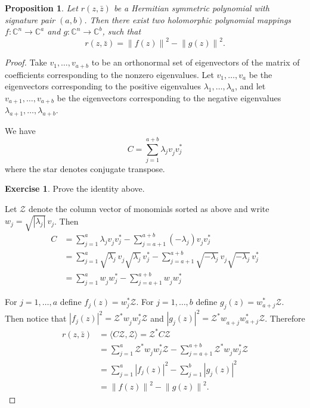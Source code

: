 \documentclass[12pt,openany]{book}
\newcommand{\abs}[1]{\left\lvert {#1} \right\rvert}
\newcommand{\norm}[1]{\left\lVert {#1} \right\rVert}
\newcommand{\C}{{\mathbb{C}}}
\newcommand{\sZ}{{\mathcal{Z}}}
\theoremstyle{plain}
\newtheorem{prop}[thm]{Proposition}
\theoremstyle{remark}
\theoremstyle{definition}
\theoremstyle{exercise}
\newtheorem{exercise}{Exercise}[section]
\theoremstyle{example}
\begin{document}
\begin{prop} \label{prop:sqnormsdecpoly}
Let $r(z,\bar{z})$ be a Hermitian symmetric polynomial with
signature pair $(a,b)$.
Then there exist
two holomorphic polynomial mappings
$f \colon \C^n \to \C^a$ and
$g \colon \C^n \to \C^b$, such that
\begin{equation}
r(z,\bar{z}) = \norm{f(z)}^2-\norm{g(z)}^2 .
\end{equation}
\end{prop}

\begin{proof}
Take $v_1,\ldots,v_{a+b}$ to be an orthonormal set of eigenvectors of
the matrix of coefficients corresponding
to the nonzero eigenvalues.
Let $v_1,\ldots,v_a$ be the eigenvectors corresponding to
the positive eigenvalues $\lambda_1,\ldots,\lambda_a$,
and let $v_{a+1},\ldots,v_{a+b}$ be the eigenvectors corresponding to
the negative eigenvalues $\lambda_{a+1},\ldots,\lambda_{a+b}$.

We have
\begin{equation}
C = \sum_{j=1}^{a+b} \lambda_j v_j^{} v_j^* 
\end{equation}
where the star denotes conjugate transpose.

\begin{exercise}
Prove the identity above.
\end{exercise}

Let $\sZ$ denote the column vector of monomials sorted as above
and write $w_j = \sqrt{\abs{\lambda_j}}\, v_j$.
Then
\begin{equation}
\begin{split}
C & = \sum_{j=1}^a \lambda_j v_j^{} v_j^* - \sum_{j=a+1}^{a+b} (-\lambda_j) v_j^{} v_j^* 
\\
& = \sum_{j=1}^a \sqrt{\lambda_j}\, v_j^{} \sqrt{\lambda_j}\, v_j^*
- \sum_{j=a+1}^{a+b} \sqrt{-\lambda_j}\, v_j^{} \sqrt{-\lambda_j}\, v_j^* 
\\
& = \sum_{j=1}^a w_j^{} w_j^*
- \sum_{j=a+1}^{a+b} w_j^{} w_j^* 
\end{split}
\end{equation}

For $j=1,\ldots,a$ define $f_j(z) = w_j^* \sZ$.
For $j=1,\ldots,b$ define $g_j(z) = w_{a+j}^* \sZ$.
Then notice that $\abs{f_j(z)}^2 =
\sZ^* w_j^{} w_j^* \sZ$ and
$\abs{g_j(z)}^2 =
\sZ^* w_{a+j}^{} w_{a+j}^* \sZ$.  Therefore
\begin{equation}
\begin{split}
r(z,\bar{z}) &= \langle C \sZ , \sZ \rangle = \sZ^* C \sZ \\
& =
\sum_{j=1}^a \sZ^* w_j^{} w_j^* \sZ - \sum_{j=a+1}^{a+b} \sZ^* w_j^{} w_j^* \sZ
\\
& = 
\sum_{j=1}^a \abs{f_j(z)}^2 - \sum_{j=1}^{b} \abs{g_j(z)}^2 \\
& =
\norm{f(z)}^2 - \norm{g(z)}^2 .
\end{split}
\end{equation}
\end{proof}
\end{document}
